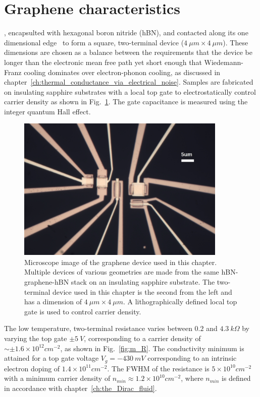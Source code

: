 \section{Graphene characteristics}
\label{section:Giorgio}
, encapsulted with hexagonal boron nitride (hBN), and contacted along its one dimensional edge~\cite{wang_one-dimensional_2013} to form a square, two-terminal device ($4~\mu m\times4~\mu m$). These dimensions are chosen as a balance between the requirements that the device be longer than the electronic mean free path yet short enough that Wiedemann-Franz cooling dominates over electron-phonon cooling, as discussed in chapter~\ref{ch:thermal_conductance_via_electrical_noise}. Samples are fabricated on insulating sapphire substrates with a local top gate to electrostatically control carrier density as shown in Fig.~\ref{fig:m_Giorgio}. The gate capacitance is measured using the integer quantum Hall effect.
\begin{figure}
\centering
\includegraphics[width=100mm]{figures/magneto/100x_crop.jpg}
\caption{Microscope image of the graphene device used in this chapter. Multiple devices of various geometries are made from the same hBN-graphene-hBN stack on an insulating sapphire substrate. The two-terminal device used in this chapter is the second from the left and has a dimension of $4~\mu m\times4~\mu m$. A lithographically defined local top gate is used to control carrier density.}
\label{fig:m_Giorgio}
\end{figure}
The low temperature, two-terminal resistance varies between $0.2$ and $4.3~k\Omega$ by varying the top gate $\pm5~V$, corresponding to a carrier density of $\sim\pm1.6\times 10^{12}cm^{-2}$, as shown in Fig.~\ref{fig:m_R}. The conductivity minimum is attained for a top gate voltage $V_g = -430~mV$ corresponding to an intrinsic electron doping of $1.4\times 10^{11}cm^{-2}$. The FWHM of the resistance is $5\times 10^{10}cm^{-2}$ with a minimum carrier density of $n_{min}\approx 1.2\times 10^{10}cm^{-2}$, where $n_{min}$ is defined in accordance with chapter~\ref{ch:the_Dirac_fluid}.

